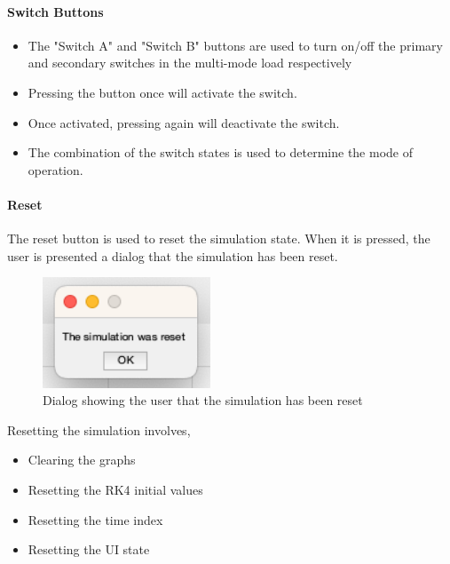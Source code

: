 \paragraph{Switch Buttons}
\begin{itemize}
	\item The "Switch A" and "Switch B" buttons are used to turn on/off the primary and secondary switches in the multi-mode load respectively
	\item Pressing the button once will activate the switch.
	\item Once activated, pressing again will deactivate the switch.
	\item The combination of the switch states is used to determine the mode of operation.
\end{itemize}

\paragraph{Reset} The reset button is used to reset the simulation state. When it is pressed, the user is presented a dialog that the simulation has been reset. 
\begin{figure}[H]
     \centering
     \includegraphics[width=5cm]{graphics/visualisation/dialog_reset}
     \caption{Dialog showing the user that the simulation has been reset}
\end{figure}
Resetting the simulation involves,
\begin{itemize}
	\item Clearing the graphs
	\item Resetting the RK4 initial values
	\item Resetting the time index
	\item Resetting the UI state
\end{itemize}

